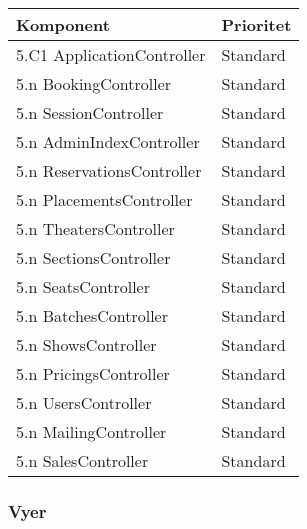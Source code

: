 \documentclass[a4paper, twoside, 11pt, titlepage]{article}
\begin{document}
		\begin {table} [ht] \begin{tabular} {  p{3.5cm} p{9.6cm} }
			\hline
			 Komponent  &  Prioritet   \\
			\hline
			 5.C1 ApplicationController  &  Standard   \\
			\hline
			 5.n BookingController  &  Standard   \\
			\hline
			 5.n SessionController  &  Standard   \\
			\hline
			 5.n AdminIndexController  &  Standard   \\
			\hline
			 5.n ReservationsController  &  Standard   \\
			\hline
			 5.n PlacementsController  &  Standard   \\
			\hline
			 5.n TheatersController  &  Standard   \\
			\hline
			 5.n SectionsController  &  Standard   \\
			\hline
			 5.n SeatsController  &  Standard   \\
			\hline
			 5.n BatchesController  &  Standard   \\
			\hline
			 5.n ShowsController  &  Standard   \\
			\hline
			 5.n PricingsController  &  Standard   \\
			\hline
			 5.n UsersController  &  Standard   \\
			\hline
			 5.n MailingController  &  Standard   \\
			\hline
			 5.n SalesController  &  Standard   \\
			\hline
		\end{tabular} \end{table} \FloatBarrier


		\subsubsection{Vyer}
\end{document}
